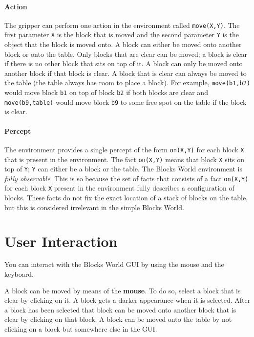 \documentclass{article}
\begin{document}
\paragraph{Action} The gripper can perform one action in the environment called \texttt{move(X,Y)}. The first parameter \texttt{X} is the block that is moved and the second parameter \texttt{Y} is the object that the block is moved onto. A block can either be moved onto another block or onto the table. Only blocks that are clear can be moved; a block is clear if there is no other block that sits on top of it. A block can only be moved onto another block if that block is clear. A block that is clear can always be moved to the table (the table always has room to place a block). For example, \texttt{move(b1,b2)} would move block \texttt{b1} on top of block \texttt{b2} if both blocks are clear and \texttt{move(b9,table)} would move block \texttt{b9} to some free spot on the table if the block is clear.

\paragraph{Percept}
The environment provides a single percept of the form \texttt{on(X,Y)} for each block \texttt{X} that is present in the environment. The fact \texttt{on(X,Y)} means that block \texttt{X} sits on top of \texttt{Y}; \texttt{Y} can either be a block or the table. The Blocks World environment is \textit{fully  observable}. This is so because the set of facts that consists of a fact \texttt{on(X,Y)} for each block \texttt{X} present in the environment fully describes a configuration of blocks. These facts do not fix the exact location of a stack of blocks on the table, but this is considered irrelevant in the simple Blocks World. 

%
%
\section{User Interaction}
%
You can interact with the Blocks World GUI by using the mouse and the keyboard.

A block can be moved by means of the \textbf{mouse}. To do so, select a block that is clear by clicking on it. A block gets a darker appearance when it is selected. After a block has been selected that block can be moved onto another block that is clear by clicking on that block. A block can be moved onto the table by not clicking on a block but somewhere else in the GUI.
\end{document}
